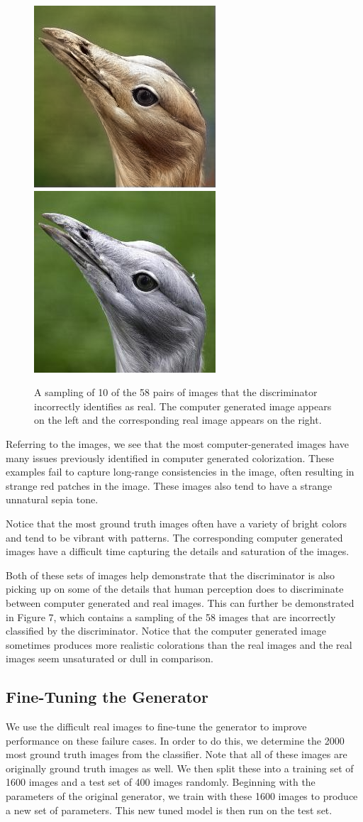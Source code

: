 \documentclass[10pt,twocolumn,letterpaper]{article}
\begin{document}
\begin{figure}[htp]
\includegraphics[width=.10\textwidth]{analysis/incorrect_classification/cr/49479.png} 
\includegraphics[width=.10\textwidth]{analysis/incorrect_classification/gt/49479.png}   \\
\caption{A sampling of 10 of the 58 pairs of images that the discriminator incorrectly identifies as real. The computer generated image appears on the left and the corresponding real image appears on the right.}

\end{figure}


Referring to the images, we see that the most computer-generated images have many issues previously identified in computer generated colorization. These examples fail to capture long-range consistencies in the image, often resulting in strange red patches in the image. These images also tend to have a strange unnatural sepia tone.

Notice that the most ground truth images often have a variety of bright colors and tend to be vibrant with patterns. The corresponding computer generated images have a difficult time capturing the details and saturation of the images. 

Both of these sets of images help demonstrate that the discriminator is also picking up on some of the details that human perception does to discriminate between computer generated and real images. This can further be demonstrated in Figure 7, which contains a sampling of the 58 images that are incorrectly classified by the discriminator. Notice that the computer generated image sometimes produces more realistic colorations than the real images and the real images seem unsaturated or dull in comparison. 

\subsection{Fine-Tuning the Generator}

We use the difficult real images to fine-tune the generator to improve performance on these failure cases. In order to do this, we determine the 2000 most ground truth images from the classifier. Note that all of these images are originally ground truth images as well. We then split these into a training set of 1600 images and a test set of 400 images randomly. Beginning with the parameters of the original generator, we train with these 1600 images to produce a new set of parameters. This new tuned model is then run on the test set. 
\end{document}
